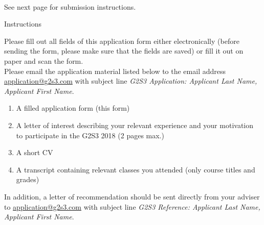 \documentclass[12pt]{article}
\begin{document}
\noindent{}\\[1cm]
\begin{center}
See next page for submission instructions.
\end{center}
\pagestyle{empty}
\newpage
\begin{center}
\large  
Instructions
\end{center}
\noindent
Please fill out all fields of this application form either
electronically (before sending the form, please make sure that the
fields are saved) or fill it out on paper and scan the form.\\

\noindent{}Please email the application material listed below to the email address
\href{mailto:application@g2s3.com}{application@g2s3.com} with
subject line \textsl{G2S3 Application: Applicant Last Name, Applicant First Name}.\\

\begin{enumerate}
\item A filled application form (this form)
\item A letter of interest describing your relevant experience and your motivation to participate in the G2S3 2018 (2 pages max.)
\item A short CV
\item A transcript containing relevant classes you attended (only course titles and grades)
\end{enumerate}
\noindent{}In addition, a letter of recommendation should be sent directly from your adviser to \href{mailto:application@g2s3.com}{application@g2s3.com} with subject line \textsl{G2S3 Reference: Applicant Last Name, Applicant First Name}.\\

\\
\pagestyle{empty}
\end{document}

